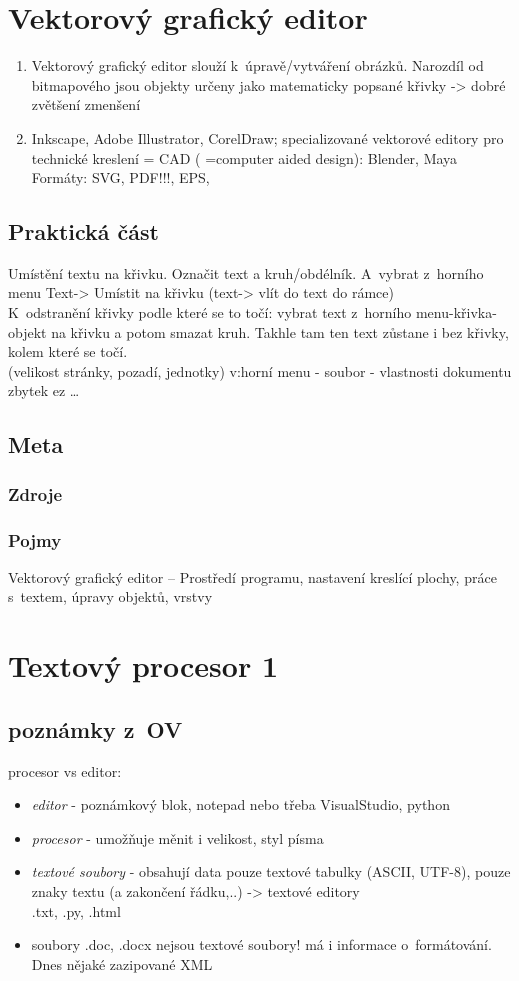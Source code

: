 \documentclass[12pt]{article}
\begin{document}
\section{Vektorový grafický editor}
\begin{enumerate}
\item Vektorový grafický editor slouží k~úpravě/vytváření obrázků. Narozdíl od bitmapového jsou objekty určeny jako matematicky popsané křivky -> dobré zvětšení zmenšení
\item Inkscape, Adobe Illustrator,  CorelDraw; specializované vektorové editory pro technické kreslení = CAD ( =computer aided design): Blender, Maya\\
Formáty: SVG, PDF!!!, EPS, 
\end{enumerate}
\subsection{Praktická část}
Umístění textu na křivku. Označit text a kruh/obdélník. A~vybrat z~horního menu Text-> Umístit na křivku (text-> vlít do text do rámce)\\
K~odstranění křivky podle které se to točí: vybrat text z~horního menu-křivka-objekt na křivku a potom smazat kruh. Takhle tam ten text zůstane i bez křivky, kolem které se točí.\\
(velikost stránky, pozadí, jednotky) v:horní menu - soubor - vlastnosti dokumentu\\
zbytek ez \dots
\subsection{Meta}
\subsubsection{Zdroje}
\subsubsection{Pojmy}
Vektorový grafický editor – Prostředí programu, nastavení kreslící plochy, práce s~textem, úpravy objektů, vrstvy

\section{Textový procesor 1}
\subsection{poznámky z~OV}
procesor vs editor:
\begin{itemize}
\item \emph{editor} - poznámkový blok, notepad nebo třeba VisualStudio, python
\item \emph{procesor} - umožňuje měnit i velikost, styl písma
\item \emph{textové soubory} - obsahují data pouze textové tabulky (ASCII, UTF-8), pouze znaky textu (a zakončení řádku,..) -> textové editory\\
.txt, .py, .html
\item soubory .doc, .docx nejsou textové soubory! má i informace o~formátování. Dnes nějaké zazipované XML
\end{itemize}
\end{document}
